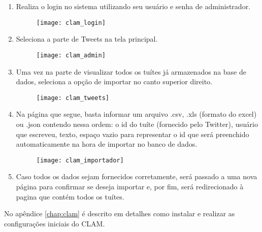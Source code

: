 \begin{enumerate}
	\item Realiza o login no sistema utilizando seu usuário e senha de administrador.
	\begin{figure}[H]
		\texttt{[image: clam\_login]}
	\end{figure}
	\item Seleciona a parte de Tweets na tela principal.
	\begin{figure}[H]
		\texttt{[image: clam\_admin]}
	\end{figure}
	\item Uma vez na parte de visualizar todos os tuítes já armazenados na base de dados,
	seleciona a opção de importar no canto superior direito.
	\begin{figure}[H]
		\texttt{[image: clam\_tweets]}
	\end{figure}
	\item Na página que segue, basta informar um arquivo .csv, .xls (formato do excel) ou .json
	contendo nessa ordem: o id do tuíte (fornecido pelo Twitter), usuário que escreveu, 
	texto, espaço vazio para representar o id que será preenchido automaticamente na hora de 
	importar no banco de dados.
	\begin{figure}[H]
		\texttt{[image: clam\_importador]}
	\end{figure}
	\item Caso todos os dados sejam fornecidos corretamente, será passado a uma nova página para
	confirmar se deseja importar e, por fim, será redirecionado à pagina que contém todos os
	tuítes.
\end{enumerate}

No apêndice \ref{chap:clam} é descrito em detalhes como instalar e realizar as
configurações iniciais do CLAM.
